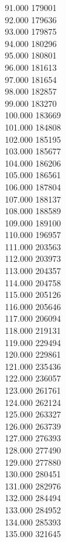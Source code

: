 { 91.000	179001 \\
 92.000	179636 \\
 93.000	179875 \\
 94.000	180296 \\
 95.000	180801 \\
 96.000	181613 \\
 97.000	181654 \\
 98.000	182857 \\
 99.000	183270 \\
 100.000	183669 \\
 101.000	184808 \\
 102.000	185195 \\
 103.000	185677 \\
 104.000	186206 \\
 105.000	186561 \\
 106.000	187804 \\
 107.000	188137 \\
 108.000	188589 \\
 109.000	189100 \\
 110.000	196957 \\
 111.000	203563 \\
 112.000	203973 \\
 113.000	204357 \\
 114.000	204758 \\
 115.000	205126 \\
 116.000	205646 \\
 117.000	206094 \\
 118.000	219131 \\
 119.000	229494 \\
 120.000	229861 \\
 121.000	235436 \\
 122.000	236057 \\
 123.000	261761 \\
 124.000	262124 \\
 125.000	263327 \\
 126.000	263739 \\
 127.000	276393 \\
 128.000	277490 \\
 129.000	277880 \\
 130.000	280451 \\
 131.000	282976 \\
 132.000	284494 \\
 133.000	284952 \\
 134.000	285393 \\
 135.000	321645 \\
}
